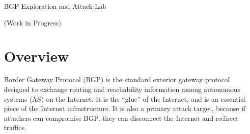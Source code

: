 
\newcommand{\commonfolder}{../../common-files}





\newcommand{\bgpFigs}{./Figs}

\newcommand{\bgpintro}{1\xspace}
\newcommand{\bgpprotocol}{3\xspace}
\newcommand{\bgpupdate}{7\xspace}
\newcommand{\pathselection}{8\xspace}
\newcommand{\bigcommunity}{9\xspace}
\newcommand{\transitas}{10\xspace}
\newcommand{\ipanycast}{11\xspace}
\newcommand{\bgphijacking}{12\xspace}


\usepackage{hyperref}




\begin{center}
{\LARGE BGP Exploration and Attack Lab}

  \vspace{0.1in}
  {\LARGE (Work in Progress)}
\end{center}






\section{Overview}

Border Gateway Protocol (BGP) is the standard exterior gateway protocol
designed to exchange routing and reachability information among autonomous
systems (AS) on the Internet. It is the ``glue'' of the Internet,
and is an essential piece of the Internet infrastructure. It is 
also a primary attack target, because if attackers can 
compromise BGP, they can disconnect the Internet and redirect traffics. 

